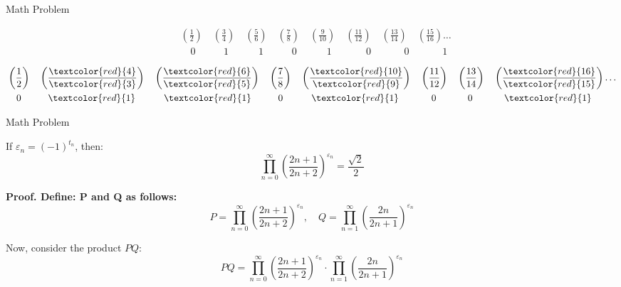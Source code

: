 \documentclass{beamer}
\begin{document}
\begin{frame}{Math Problem}

    \[
    \begin{aligned}
        &\left(\frac{1}{2}\right) \quad \left(\frac{3}{4}\right) \quad \left(\frac{5}{6}\right) \quad \left(\frac{7}{8}\right) \quad \left(\frac{9}{10}\right) \quad \left(\frac{11}{12}\right) \quad \left(\frac{13}{14}\right) \quad \left(\frac{15}{16}\right) \dots \\
        &\quad 0 \quad \quad \:\:\:\, 1 \,\quad \quad \, \, \, \, \,1 \quad \quad \, \, \, \,\, 0 \quad \quad \quad  1 \quad \qquad \; \,0 \qquad \quad \,\,0 \qquad \quad \, \,  1
    \end{aligned}
    \]
    
    \[
    \begin{aligned}
        &\left(\frac{1}{2}\right) \quad \left(\frac{\textcolor{red}{4}}{\textcolor{red}{3}}\right) \quad \left(\frac{\textcolor{red}{6}}{\textcolor{red}{5}}\right) \quad \left(\frac{7}{8}\right) \quad \left(\frac{\textcolor{red}{10}}{\textcolor{red}{9}}\right) \quad \left(\frac{11}{12}\right) \quad \left(\frac{13}{14}\right) \quad \left(\frac{\textcolor{red}{16}}{\textcolor{red}{15}}\right) \dots \\
        &\quad 0 \quad \quad \:\:\:\, \textcolor{red}{1} \,\quad \quad \, \, \, \, \,\textcolor{red}{1} \quad \quad \, \, \, \,\, 0 \quad \quad \quad  \textcolor{red}{1} \quad \qquad \; \,0 \qquad \quad \,\,0 \qquad \quad \, \,  \textcolor{red}{1}
    \end{aligned}
    \]

\end{frame}

\begin{frame}{Math Problem}

\scriptsize

    \begin{theorem}
        If \( \varepsilon_n = (-1)^{t_n} \), then:
        \[
        \prod_{n=0}^\infty \left(\frac{2n+1}{2n+2}\right)^{\varepsilon_n} = \frac{\sqrt{2}}{2}
        \]
    \end{theorem}
    
    \textbf{Proof. Define: P and Q as follows:}
    \[
    P = \prod_{n=0}^\infty \left(\frac{2n+1}{2n+2}\right)^{\varepsilon_n},
    \quad
    Q = \prod_{n=1}^\infty \left(\frac{2n}{2n+1}\right)^{\varepsilon_n}
    \]
    
    Now, consider the product \(PQ\):
    \[
    PQ = \prod_{n=0}^\infty \left(\frac{2n+1}{2n+2}\right)^{\varepsilon_n} \cdot \prod_{n=1}^\infty \left(\frac{2n}{2n+1}\right)^{\varepsilon_n}
    \]

\end{frame}
\end{document}
